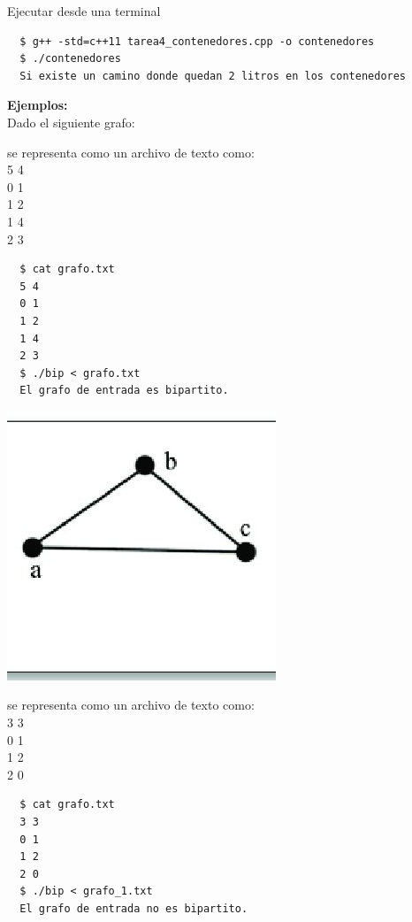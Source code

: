\documentclass{article}
\begin{document}
Ejecutar desde una terminal

\begin{commandline}
\begin{verbatim}
  $ g++ -std=c++11 tarea4_contenedores.cpp -o contenedores
  $ ./contenedores
  Si existe un camino donde quedan 2 litros en los contenedores
\end{verbatim}
\end{commandline}

\newpage

\textbf{Ejemplos:}\\

Dado el siguiente grafo:


se representa como un archivo de texto como:\\
5 4\\
0 1\\
1 2\\
1 4\\
2 3\\

\begin{commandline}
\begin{verbatim}
  $ cat grafo.txt
  5 4
  0 1
  1 2
  1 4
  2 3
  $ ./bip < grafo.txt
  El grafo de entrada es bipartito.
\end{verbatim}
\end{commandline}
\newpage
\includegraphics[scale=0.9]{nobip.jpg}

se representa como un archivo de texto como:\\
3 3\\
0 1\\
1 2\\
2 0\\

\begin{commandline}
\begin{verbatim}
  $ cat grafo.txt
  3 3
  0 1
  1 2
  2 0
  $ ./bip < grafo_1.txt
  El grafo de entrada no es bipartito.
\end{verbatim}
\end{commandline}
\end{document}
